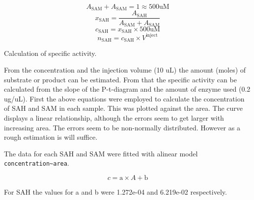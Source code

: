 \documentclass[]{tufte-handout}
\begin{document}
\begin{marginfigure}
$$A_\mathrm{SAM} + A_\mathrm{SAM} = 1 \approx 500 \mathrm{uM}$$
$$x_\mathrm{SAH} = \frac{A_\mathrm{SAH}}{A_\mathrm{SAM} + A_\mathrm{SAM}}$$
$$c_\mathrm{SAH} = x_\mathrm{SAH} \times 500 \mathrm{uM}$$
$$n_\mathrm{SAH} = c_\mathrm{SAH} \times V^\mathrm{inject}$$
\caption{Calculation of specific activity.}
\end{marginfigure}

From the concentration and the injection volume (10 uL) the amount
(moles) of substrate or product can be estimated. From that the specific
activity can be calculated from the slope of the P-t-diagram and the
amount of enzyme used (0.2 ug/uL). First the above equations were
employed to calculate the concentration of SAH and SAM in each sample.
This was plotted against the area. The curve displays a linear
relationship, although the errors seem to get larger with increasing
area. The errors seem to be non-normally distributed. However as a rough
estimation is will suffice.

The data for each SAH and SAM were fitted with alinear model
\texttt{concentration\textasciitilde{}area}.

\begin{equation}
c = \mathrm{a}\times A + \mathrm{b}
\end{equation}

For SAH the values for a and b were 1.272e-04 and 6.219e-02
respectively.
\end{document}
